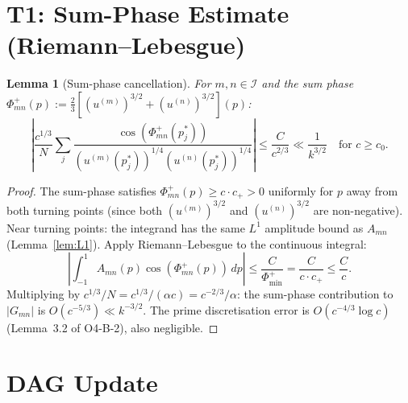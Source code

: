 \documentclass[12pt,a4paper]{amsart}
\newtheorem{lemma}[theorem]{Lemma}
\theoremstyle{definition}
\newcommand{\dd}{\,d}
\begin{document}
\section{T1: Sum-Phase Estimate (Riemann--Lebesgue)}
\label{sec:T1}

\begin{lemma}[Sum-phase cancellation]\label{lem:T1}
For $m, n \in \mathcal{I}$ and the sum phase
$\Phi^+_{mn}(p) := \frac{2}{3}[(u^{(m)})^{3/2} + (u^{(n)})^{3/2}](p)$:
\[
  \left|\frac{c^{1/3}}{N}\sum_j
  \frac{\cos(\Phi^+_{mn}(p_j^*))}{(u^{(m)}(p_j^*))^{1/4}(u^{(n)}(p_j^*))^{1/4}}
  \right|
  \leq \frac{C}{c^{2/3}} \ll \frac{1}{k^{3/2}}
  \quad\text{for } c \geq c_0.
\]
\end{lemma}

\begin{proof}
The sum-phase satisfies $\Phi^+_{mn}(p) \geq c \cdot c_+ > 0$
uniformly for $p$ away from both turning points
(since both $(u^{(m)})^{3/2}$ and $(u^{(n)})^{3/2}$ are non-negative).
Near turning points: the integrand has the same
$L^1$ amplitude bound as $A_{mn}$ (Lemma~\ref{lem:L1}).
Apply Riemann--Lebesgue to the continuous integral:
\[
  \left|\int_{-1}^1 A_{mn}(p)\cos(\Phi^+_{mn}(p))\dd p\right|
  \leq \frac{C}{\Phi^+_{\min}} = \frac{C}{c \cdot c_+} \leq \frac{C}{c}.
\]
Multiplying by $c^{1/3}/N = c^{1/3}/(\alpha c) = c^{-2/3}/\alpha$:
the sum-phase contribution to $|G_{mn}|$ is $O(c^{-5/3}) \ll k^{-3/2}$.
The prime discretisation error is $O(c^{-4/3}\log c)$ (Lemma~3.2 of O4-B-2),
also negligible.
\end{proof}

\section{DAG Update}
\label{sec:dag}
\end{document}
